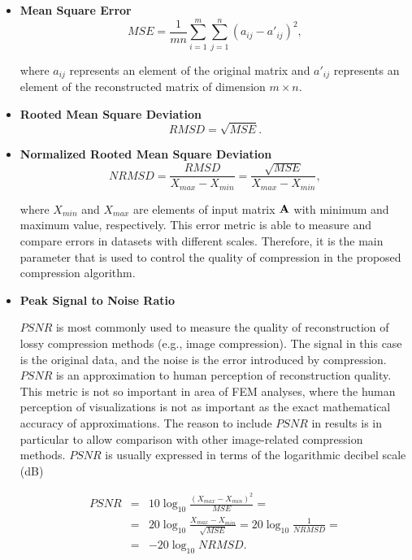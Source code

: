 \begin{itemize}

\item \textbf{Mean Square Error}
\begin{equation}
\mathit{MSE}=\frac{1}{m n} \sum_{i=1}^{m} \sum_{j=1}^{n} (a_{ij} - a'_{ij})^{2},
\label{eq:mse-def}
\end{equation}

\noindent
where $a_{ij}$ represents an element of the original matrix and $a'_{ij}$ represents an element of the
reconstructed matrix of dimension $m \times n$.

\item \textbf{Rooted Mean Square Deviation}
\begin{equation}
\mathit{RMSD} = \sqrt{\mathit{MSE}}.
\label{eq:rmsd-def}
\end{equation}

\item \textbf{Normalized Rooted Mean Square Deviation}
\begin{equation}
\mathit{NRMSD} = \frac{\mathit{RMSD}}{X_{max}-X_{min}}=\frac{\sqrt{\mathit{MSE}}}{X_{max}-X_{min}},
\label{eq:nrmsd-def}
\end{equation}

\noindent
where $X_{min}$ and $X_{max}$ are elements of input matrix $\mathbf{A}$ with minimum and maximum value, respectively. This error metric is able to measure and compare errors in datasets with different scales. Therefore, it is the main parameter that is used to control the quality of compression in the proposed compression algorithm.

\item \textbf{Peak Signal to Noise Ratio}

$\mathit{PSNR}$ is most commonly used to measure the quality of reconstruction of lossy compression methods (e.g., image compression). The signal in this case is the original data, and the noise is the error introduced by compression. $\mathit{PSNR}$ is an approximation to human perception of reconstruction quality. This metric is not so important in area of FEM analyses, where the human perception of visualizations is not as important as the exact mathematical accuracy of approximations. The reason to include $\mathit{PSNR}$ in results is in particular to allow comparison with other image-related compression methods. $\mathit{PSNR}$ is usually expressed in terms of the logarithmic decibel scale (dB)

\begin{eqnarray}
\mathit{PSNR} &=& 10\log_{10}\frac{(X_{max}-X_{min})^{2}}{\mathit{MSE}} =
\\
&=& 20\log_{10}\frac{X_{max}-X_{min}}{\sqrt{\mathit{MSE}}}=20\log_{10}\frac{1}{\mathit{NRMSD}} = \nonumber
\\
&=& -20\log_{10}\mathit{NRMSD}. \nonumber
\label{eq:psnr-def}
\end{eqnarray}


\end{itemize}
